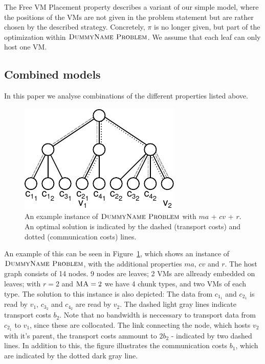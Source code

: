 \documentclass[9pt,twocolumn]{scrartcl}
\newcommand{\Problem}{\textsc{DummyName Problem}}
\newcommand{\MaFactor}{\ensuremath{\textsc{MA}}}
\newcommand{\RedundancyFactor}{\ensuremath{r}}
\newcommand{\NodeMapping}{\pi}
\newcommand{\VirtualNode}{v}
\newcommand{\SubstrateNodes}{\ensuremath{V_S}}
\newcommand{\SubstrateNode}{\ensuremath{v}}
\newcommand{\achunk}{\ensuremath{c}}
\newcommand{\CostCom}{\ensuremath{b_1}}
\newcommand{\CostTrans}{\ensuremath{b_2}}
\begin{document}
\begin{appendix}
\begin{algorithm}[tbhp]
\caption{$binarize(\SubstrateNode \in \SubstrateNodes)$}
\label{algo:binarization}
\end{algorithm}


The Free VM Placement property describes a variant of our simple model, where
the positions of the VMs are not given in the problem statement but are
rather chosen by the described strategy. Concretely, $\NodeMapping$ is no
longer given, but part of the optimization within $\Problem$. We assume that
each leaf can only host one VM.

\subsection{Combined models} In this paper we analyse combinations of the
different properties listed above.

\begin{figure}[htbp]
\includegraphics[width =\columnwidth]{figs/model_ma_r_cv}
\caption{An example instance of $\Problem$ with $ma$ + $cv$ + $r$. An
optimal solution is indicated by the dashed (transport costs) and dotted
(communication costs) lines. }
\label{fig:model_combined}
\end{figure}

An example of this can be seen in Figure~\ref{fig:model_combined}, which shows
an instance of $\Problem$, with the additional properties $ma$, $cv$ and $r$.
The host graph consists of 14 nodes. 9 nodes are leaves; 2 VMs are allready
embedded on leaves; with $\RedundancyFactor = 2$ and $\MaFactor = 2$ we have 4
chunk types, and two VMs of each type. The solution to this instance is also
depicted: The data from $\achunk_{1_1}$ and $\achunk_{2_1}$ is read by
$\VirtualNode_1$, $\achunk_{3_2}$ and $\achunk_{4_2}$ are read by
$\VirtualNode_2$. The dashed light gray lines indicate transport
costs $\CostTrans$. Note that no bandwidth is neccessary to transport data from
$\achunk_{2_1}$ to $\VirtualNode_1$, since these are collocated. The link
connecting the node, which hosts $\VirtualNode_2$ with it's parent, the
transport costs ammount to $2 \CostTrans$ - indicated by two dashed lines. In
addition to this, the figure illustrates the communication costs $\CostCom$,
which are indicated by the dotted dark gray line.


\end{appendix}
\end{document}
